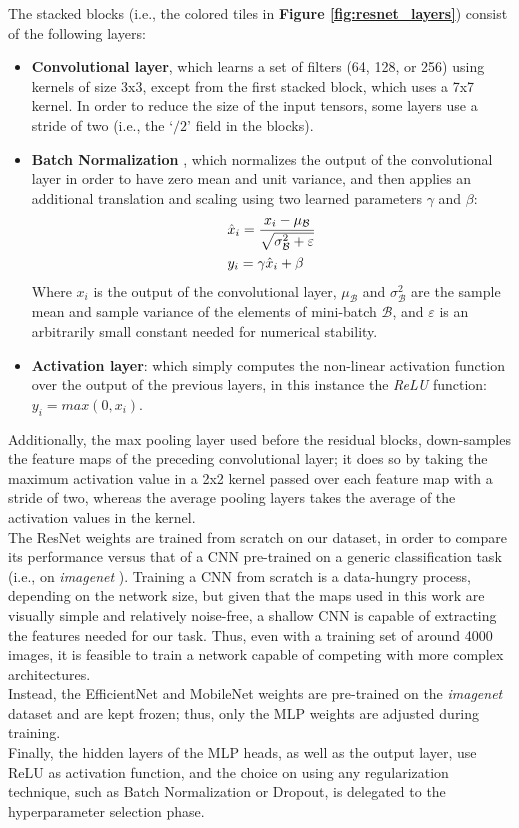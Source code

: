 \noindent
The stacked blocks (i.e., the colored tiles in \textbf{Figure \ref{fig:resnet_layers}}) consist of the following layers:
\begin{itemize}
    \item \textbf{Convolutional layer}, which learns a set of filters (64, 128, or 256) using kernels of size 3x3, except from the first stacked block, which uses a 7x7 kernel. In order to reduce the size of the input tensors, some layers use a stride of two (i.e., the `$/2$' field in the blocks).
    
    \item \textbf{Batch Normalization} \cite{ioffe2015batch}, which normalizes the output of the convolutional layer in order to have zero mean and unit variance, and then applies an additional translation and scaling using two learned parameters $\gamma$ and $\beta$:
    \begin{equation*}
    \begin{split}
        \centering
            &\hat x_i = \frac{x_i - \mu_\mathcal{B}}{\sqrt{\sigma^2_\mathcal{B} + \varepsilon}}\\
            &y_i = \gamma\hat x_i + \beta\\
    \end{split}
    \end{equation*}
    Where $x_i$ is the output of the convolutional layer, $\mu_\mathcal{B}$ and $\sigma^2_\mathcal{B}$ are the sample mean and sample variance of the elements of mini-batch $\mathcal{B}$, and $\varepsilon$ is an arbitrarily small constant needed for numerical stability.
    
    \item \textbf{Activation layer}: which simply computes the non-linear activation function over the output of the previous layers, in this instance the \textit{ReLU} function: $y_i = max(0, x_i)$. 
\end{itemize}

\noindent
Additionally, the max pooling layer used before the residual blocks, down-samples the feature maps of the preceding convolutional layer; it does so by taking the maximum activation value in a 2x2 kernel passed over each feature map with a stride of two, whereas the average pooling layers takes the average of the activation values in the kernel.\\

\noindent
The ResNet weights are trained from scratch on our dataset, in order to compare its performance versus that of a CNN pre-trained on a generic classification task (i.e., on \textit{imagenet} \cite{deng2009imagenet}). Training a CNN from scratch is a data-hungry process, depending on the network size, but given that the maps used in this work are visually simple and relatively noise-free, a shallow CNN is capable of extracting the features needed for our task. Thus, even with a training set of around 4000 images, it is feasible to train a network capable of competing with more complex architectures.\\
Instead, the EfficientNet and MobileNet weights are pre-trained on the \textit{imagenet} dataset  and are kept frozen; thus, only the MLP weights are adjusted during training.\\

\noindent
Finally, the hidden layers of the MLP heads, as well as the output layer, use ReLU as activation function, and the choice on using any regularization technique, such as Batch Normalization or Dropout, is delegated to the hyperparameter selection phase.
